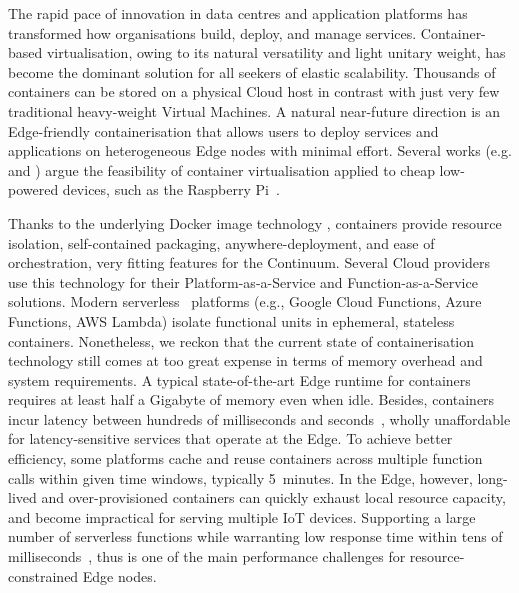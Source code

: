The rapid pace of innovation in data centres and application platforms has transformed how organisations build, deploy, and manage services.
Container-based virtualisation, owing to its natural versatility and light unitary weight, has become the dominant solution for all seekers of elastic scalability.
Thousands of containers can be stored on a physical Cloud host in contrast with just very few traditional heavy-weight Virtual Machines. 
A natural near-future direction is an Edge-friendly containerisation that allows users to deploy services and applications on heterogeneous Edge nodes with minimal effort. 
Several works (e.g. \cite{pahl2016container} and \cite{bellavista2017feasibility}) argue the feasibility of container virtualisation applied to cheap low-powered devices, such as the Raspberry Pi~\cite{raspberry}. 

Thanks to the underlying Docker image technology \cite{docker-image}, containers provide resource isolation, self-contained packaging, anywhere-deployment, and ease of orchestration, very fitting features for the Continuum.
Several Cloud providers use this technology for their Platform-as-a-Service and Function-as-a-Service solutions. Modern serverless~\cite{jonas2019Cloud} platforms (e.g., Google Cloud Functions, Azure Functions, AWS Lambda) isolate functional units in ephemeral, stateless containers. 
Nonetheless, we reckon that the current state of containerisation technology still comes at too great expense in terms of memory overhead and system requirements. A typical state-of-the-art Edge runtime for containers requires at least half a Gigabyte of memory even when idle.
Besides, containers incur latency between hundreds of milliseconds and seconds~\cite{mohanty2018evaluation}, wholly unaffordable for latency-sensitive services that operate at the Edge. 
To achieve better efficiency, some platforms cache and reuse containers across multiple function calls within given time windows, typically 5~minutes. 
In the Edge, however, long-lived and over-provisioned containers can quickly exhaust local resource capacity, and become impractical for serving multiple IoT devices. 
Supporting a large number of serverless functions while warranting low response time within tens of milliseconds~\cite{elbamby2019wireless}, thus is one of the main performance challenges for resource-constrained Edge nodes.


